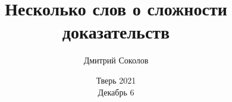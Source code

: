

\titlegraphic{
    
}


\title[Сложность доказательств]{
    Несколько слов о сложности доказательств
}

\author[Соколов Д.]{
    Дмитрий Соколов
}  


\date{Тверь 2021\\ Декабрь 6}






    \maketitle

    
    
    
    
    
    

